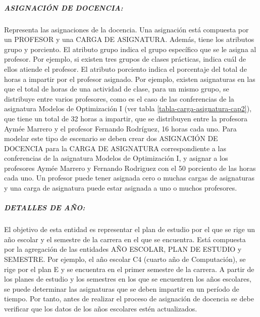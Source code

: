 \subparagraph{ASIGNACIÓN DE DOCENCIA:}
Representa las asignaciones de la docencia. Una asignación está compuesta
por un PROFESOR y una CARGA DE ASIGNATURA. Además, tiene  
los atributos grupo y porciento. El atributo grupo indica el grupo específico que 
se le asigna al profesor. Por ejemplo, si existen tres grupos de clases prácticas, 
indica cuál de ellos atiende el profesor.
El atributo porciento indica el porcentaje del total de horas a impartir por el profesor 
asignado. Por ejemplo, existen asignaturas en las que el total 
de horas de una actividad de clase, para un mismo grupo, se distribuye entre varios profesores, como es el caso de las
conferencias de la asignatura Modelos de Optimización I (ver tabla \ref{tabla-carga-asignatura-cap2}), que tiene un total
de 32 horas a impartir, que se distribuyen entre la profesora Aymée Marrero 
y el profesor Fernando Rodríguez, 16 horas cada uno. Para modelar este tipo de escenario
se deben crear dos ASIGNACIÓN DE DOCENCIA para la CARGA DE ASIGNATURA correspondiente a las 
conferencias de la asignatura Modelos de Optimización I, y asignar a los profesores 
Aymée Marrero y Fernando Rodriguez con el 50 porciento de las horas cada uno.  
Un profesor puede tener asignada cero o muchas cargas de asignaturas y una carga de 
asignatura puede estar asignada a uno o muchos profesores.


\subparagraph{DETALLES DE AÑO:}
El objetivo de esta entidad es representar el plan de estudio 
por el que se rige un año escolar y el semestre de la carrera en el que 
se encuentra. Está 
compuesta por la agregación de las entidades AÑO ESCOLAR, PLAN DE ESTUDIO y 
SEMESTRE. Por ejemplo, el 
año escolar C4 (cuarto año de Computación), se rige por el plan E y se encuentra en el primer semestre de la carrera.
A partir de los planes de estudio y los semestres en los que se encuentren los años escolares, 
se puede determinar las asignaturas que se deben impartir en un período de tiempo. Por tanto, antes 
de realizar el proceso de asignación de docencia se debe verificar que los datos 
de los años escolares estén actualizados.


    




